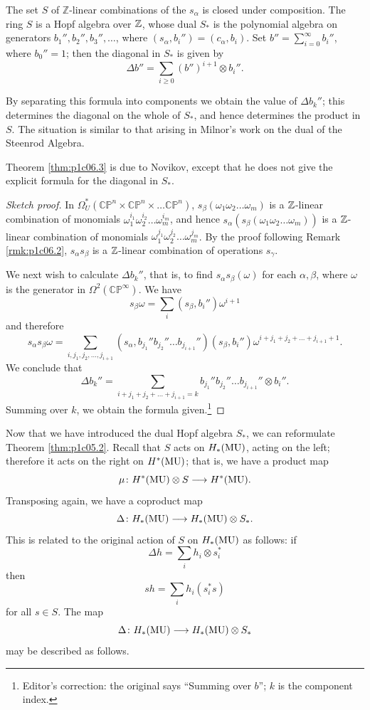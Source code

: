 \documentclass[../main]{subfiles}
\begin{document}
\begin{theorem}\label{thm:p1c06.3}
The set $S$ of $\mathbb{Z}$-linear combinations of the $s_\alpha$ is closed under composition. The ring $S$ is a Hopf algebra over $\mathbb{Z}$, whose dual $S_*$ is the polynomial algebra on generators $b_1'',b_2'',b_3'',\dots$, where $(s_\alpha,b_i'') = (c_\alpha,b_i)$. Set $b'' = \displaystyle\sum_{i=0}^\infty b_i''$, where $b_0'' = 1$; then the diagonal in $S_*$ is given by 
\[\Delta b'' = \sum_{i \geq 0} (b'')^{i+1} \otimes b_i ''.\]
\end{theorem}
\begin{explanation}
By separating this formula into components we obtain the value of $\Delta b_k''$; this determines the diagonal on the whole of $S_*$, and hence determines the product in $S$. The situation is similar to that arising in Milnor's work on the dual of the Steenrod Algebra.
\end{explanation}
Theorem \ref{thm:p1c06.3} is due to Novikov, except that he does not give the explicit formula for the diagonal in $S_*$.
\begin{proof}[Sketch proof]
In $\Omega_U^*(\mathbb{CP}^n \times \mathbb{CP}^n \times \dots \mathbb{CP}^n)$, $s_\beta(\omega_1 \omega_2 \dots \omega_m)$ is a $\mathbb{Z}$-linear combination of monomials $\omega_1^{i_1} \omega_2^{i_2} \dots \omega_m^{i_m}$, and hence $s_\alpha(s_\beta(\omega_1 \omega_2 \dots \omega_m))$ is a $\mathbb{Z}$-linear combination of monomials  $\omega_1^{j_1} \omega_2^{j_2} \dots \omega_m^{j_m}$. By the proof following Remark \ref{rmk:p1c06.2}, $s_\alpha s_\beta$ is a $\mathbb{Z}$-linear combination of operations $s_\gamma$.

We next wish to calculate $\Delta b_k''$, that is, to find $s_\alpha s_\beta(\omega)$ for each $\alpha,\beta$, where $\omega$ is the generator in $\Omega^2(\mathbb{CP}^\infty)$. We have
\[s_\beta \omega = \sum_i (s_\beta , b_i'')\omega^{i+1}\]
and therefore
\[s_\alpha s_\beta\omega = \sum_{i,j_1,j_2,\dots,j_{i+1}} (s_\alpha, b_{j_1}''b_{j_2}'' \dots b_{j_{i+1}}'')(s_\beta,b_i'') \omega^{i + j_1 + j_2 + \dots + j_{i+1}+1}.\]
We conclude that
\[\Delta b_k'' = \sum_{i + j_1 + j_2 + \dots + j_{i+1} = k}b_{j_1}''b_{j_2}'' \dots b_{j_{i+1}}'' \otimes b_i''.\]
Summing over $k$, we obtain the formula given.\footnote{Editor's correction: the original says ``Summing over $b$''; $k$ is the component index.}
\end{proof}
\begin{note}
Now that we have introduced the dual Hopf algebra $S_*$, we can reformulate Theorem \ref{thm:p1c05.2}. Recall that $S$ acts on $H_*(\mathrm{MU})$, acting on the left; therefore it acts on the right on $H^*(\mathrm{MU})$; that is, we have a product map
\[\mu\colon H^*(\mathrm{MU}) \otimes S \longrightarrow H^*(\mathrm{MU}).\]
Transposing again, we have a coproduct map
\[\Delta\colon H_*(\mathrm{MU}) \longrightarrow H_*(\mathrm{MU}) \otimes S_*.\]
This is related to the original action of $S$ on $H_*(\mathrm{MU})$ as follows: if
\[\Delta h = \sum_i h_i \otimes s_i^*\]
then
\[sh = \sum_i h_i(s_i^* s)\]
for all $s \in S$. The map
\[\Delta \colon H_*(\mathrm{MU}) \longrightarrow H_*(\mathrm{MU}) \otimes S_*\]
may be described as follows.
\end{note}
\end{document}
